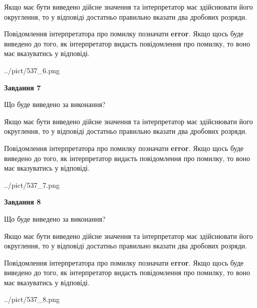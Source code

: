 \documentclass[12pt, ukrainian]{article}
\begin{document}
{\begin {Large}
Якщо має бути виведено дійсне значення та інтерпретатор має здійснювати його округлення, 
то у відповіді достатньо правильно вказати два дробових розряди.

Повідомлення інтерпретатора про помилку позначати \textbf{error}.
Якщо щось буде виведено до того, як інтерпретатор видасть повідомлення про помилку, 
то воно має вказуватись у відповіді. \par

\begin{center}
	{../pict/537_6.png}
\end{center}
\newpage

{\begin {center}\textbf{Завдання 7}\end {center}}\par
Що буде виведено за виконання? \par

Якщо має бути виведено дійсне значення та інтерпретатор має здійснювати його округлення, 
то у відповіді достатньо правильно вказати два дробових розряди.

Повідомлення інтерпретатора про помилку позначати \textbf{error}.
Якщо щось буде виведено до того, як інтерпретатор видасть повідомлення про помилку, 
то воно має вказуватись у відповіді. \par

\begin{center}
	{../pict/537_7.png}
\end{center}
\newpage

{\begin {center}\textbf{Завдання 8}\end {center}}\par
Що буде виведено за виконання? \par

Якщо має бути виведено дійсне значення та інтерпретатор має здійснювати його округлення, 
то у відповіді достатньо правильно вказати два дробових розряди.

Повідомлення інтерпретатора про помилку позначати \textbf{error}.
Якщо щось буде виведено до того, як інтерпретатор видасть повідомлення про помилку, 
то воно має вказуватись у відповіді. \par

\begin{center}
	{../pict/537_8.png}
\end{center}
\newpage


\end{Large}}
\end{document}
